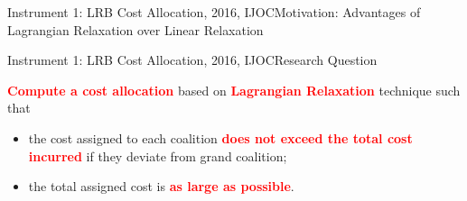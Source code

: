 \documentclass[14pt]{beamer}
\begin{document}
\begin{frame}{Instrument 1: LRB Cost Allocation, {\footnotesize 2016, IJOC}}{Motivation: Advantages of Lagrangian Relaxation over Linear Relaxation}
\end{frame}



\begin{frame}{Instrument 1: LRB Cost Allocation, {\footnotesize 2016, IJOC}}{Research Question}
\begin{shaded}
\small
\textcolor{red}{\bf Compute a cost allocation} based on \textcolor{red}{\bf Lagrangian Relaxation} technique such that
\begin{itemize}
\item  the cost assigned to each coalition \textcolor{red}{\bf  does not exceed the total cost incurred} if they deviate from grand coalition;
\item the total assigned cost is \textcolor{red}{\bf as large as possible}.
\end{itemize}
\vspace{-2mm}
\end{shaded}
\end{frame}
\end{document}
